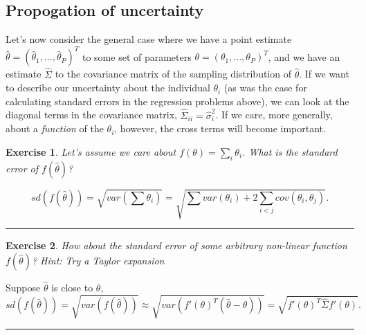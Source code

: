 \documentclass[twoside]{article}
\newcounter{lecnum}
\newtheorem{exercise}{Exercise}[lecnum]
\newenvironment{proof}{{\bf Proof:}}{\hfill\rule{2mm}{2mm}}
\begin{document}
\subsection{Propogation of uncertainty}
Let's now consider the general case where we have a point estimate $\hat{\theta} = (\hat{\theta}_1,\dots, \hat{\theta}_P)^T$ to some set of parameters $\theta = (\theta_1,\dots,\theta_P)^T$, and we have an estimate $\hat{\Sigma}$ to the covariance matrix of the sampling distribution of $\hat{\theta}$. If we want to describe our uncertainty about the individual $\theta_i$ (as was the case for calculating standard errors in the regression problems above), we can look at the diagonal terms in the covariance matrix, $\hat{\Sigma}_{ii} = \hat{\sigma}_i^2$. If we care, more generally, about a \textit{function} of the $\theta_i$, however, the cross terms will become important.

\begin{exercise}
  Let's assume we care about $f(\theta) = \sum_i \theta_i$. What is the standard error of $f(\hat{\theta})$?
\end{exercise}

\begin{proof}
$$sd(f(\hat{\theta})) = \sqrt{var(\sum\theta_i)} = \sqrt{\sum var(\theta_i) + 2\sum_{i<j}cov(\theta_i,\theta_j)}.$$
\end{proof}
\begin{exercise}
  How about the standard error of some arbitrary non-linear function $f(\hat{\theta})$? \textit{Hint: Try a Taylor expansion}
\end{exercise}
\begin{proof}
Suppose $\hat{\theta}$ is close to $\theta$, 
$$sd(f(\hat{\theta})) = \sqrt{var(f(\hat{\theta}))} \approx \sqrt{var(f'(\theta)^T(\hat{\theta}-\theta))} = \sqrt{f'(\theta)^T\hat{\Sigma}f'(\theta)}.$$
\end{proof}
\end{document}
